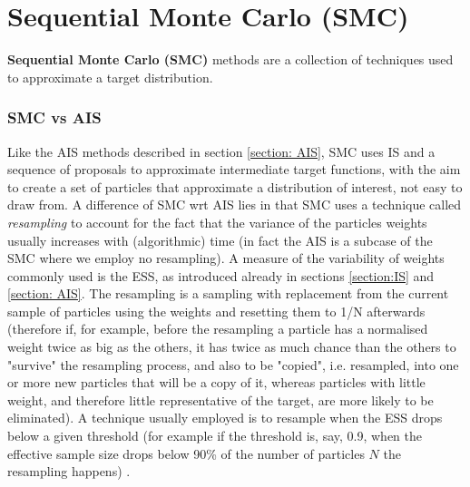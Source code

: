 \documentclass[12pt,mythesisstyle]{report}
\begin{document}
\section{Sequential Monte Carlo (SMC)}\label{section: SMC}
\textbf{Sequential Monte Carlo (SMC)} methods are a collection of techniques used to approximate a target distribution.
\subsubsection{SMC vs AIS}
Like the AIS methods described in section \ref{section: AIS}, SMC uses IS and a sequence of proposals to approximate intermediate target functions, with the aim to create a set of particles that approximate a distribution of interest, not easy to draw from. A difference of SMC wrt AIS lies in that SMC uses a technique called \textit{resampling} to account for the fact that the variance of the particles weights usually increases with (algorithmic) time (in fact the AIS is a subcase of the SMC where we employ no resampling). A measure of the variability of weights commonly used is the ESS, as introduced already in sections \ref{section:IS} and \ref{section: AIS}. The resampling is a sampling with replacement from the current sample of particles using the weights and resetting them to 1/N afterwards (therefore if, for example, before the resampling a particle has a normalised weight twice as big as the others, it has twice as much chance than the others to "survive" the resampling process, and also to be "copied", i.e. resampled, into one or more new particles that will be a copy of it, whereas particles with little weight, and therefore little representative of the target, are more likely to be eliminated). A technique usually employed is to resample when the ESS drops below a given threshold (for example if the threshold is, say, 0.9, when the effective sample size drops below 90\% of the number of particles $N$ the resampling happens) \cite{crisan1}.
\end{document}
